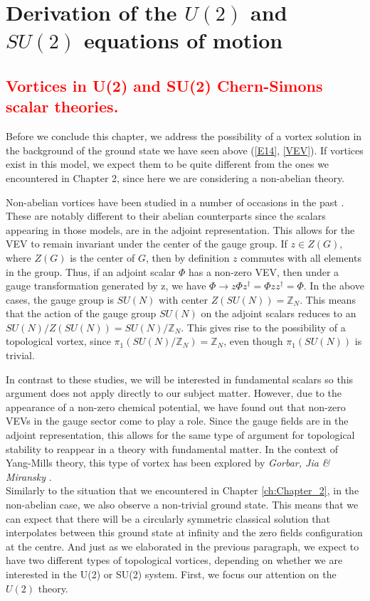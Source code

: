 \chapter{Derivation of the $U(2)$ and $SU(2)$ equations of motion}



\textcolor{red}{\section{Vortices in U(2) and SU(2) Chern-Simons scalar theories.}}
Before we conclude this chapter, we address the possibility of a vortex solution in the background of the ground state we have seen above (\ref{E14}, \ref{VEV}). If vortices exist in this model, we expect them to be quite different from the ones we encountered in Chapter 2, since here we are considering a non-abelian theory. 

Non-abelian vortices have been studied in a number of occasions in the past \cite{deVega:1986eu, Kumar:1986yz, Blazquez-Salcedo:2013roa, NavarroLerida:2009dm}. These are notably different to their abelian counterparts since the scalars appearing in those models, are in the adjoint representation. This allows for the VEV to remain invariant under the center of the gauge group. If $z\in Z(G)$, where $Z(G)$ is the center of $G$, then by definition $z$ commutes with all elements in the group. Thus, if an adjoint scalar $\Phi$ has a non-zero VEV, then under a gauge transformation generated by z, we have $\Phi \rightarrow z\Phi z^{\dag} =\Phi z z^{\dag} = \Phi$. In the above cases, the gauge group is $SU(N)$ with center $Z(SU(N)) =\mathbb{Z}_N$. This means that the action of the gauge group $SU(N)$ on the adjoint scalars reduces to an $SU(N)/Z(SU(N))= SU(N)/\mathbb{Z}_N$. This gives rise to the possibility of a topological vortex, since $\pi_1(SU(N)/\mathbb{Z}_N)=\mathbb{Z}_N$, even though $\pi_1(SU(N))$ is trivial.

In contrast to these studies, we will be interested in fundamental scalars so this argument does not apply directly to our subject matter. However, due to the appearance of a non-zero chemical potential, we have found out that non-zero VEVs in the gauge sector come to play a role. Since the gauge fields are in the adjoint representation, this allows for the same type of argument for topological stability to reappear in a theory with fundamental matter. In the context of Yang-Mills theory, this type of vortex has been explored by \textit{Gorbar, Jia \& Miransky} \cite{Gorbar:2005pi}.\\  
\indent Similarly to the situation that we encountered in Chapter \ref{ch:Chapter_2}, in the non-abelian case, we also observe a non-trivial ground state. This means that we can expect that there will be a circularly symmetric classical solution that interpolates between this ground state at infinity and the zero fields configuration at the centre. And just as we elaborated in the previous paragraph, we expect to have two different types of topological vortices, depending on whether we are interested in the U(2) or SU(2) system. First, we focus our attention on the $U(2)$ theory.

